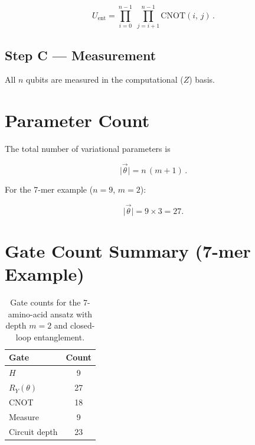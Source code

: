 \documentclass[11pt,a4paper]{article}
\begin{document}
\begin{equation}
  U_{\mathrm{ent}}
    = \prod_{i=0}^{n-1}\;\prod_{j=i+1}^{n-1}
      \mathrm{CNOT}(i,\,j)\,.
\end{equation}

\subsection{Step C --- Measurement}

All $n$ qubits are measured in the computational ($Z$) basis.

\section{Parameter Count}

The total number of variational parameters is

\begin{equation}
  \lvert\vec\theta\rvert = n\,(m+1)\,.
\end{equation}

For the 7-mer example ($n=9$, $m=2$):

\begin{equation}
  \lvert\vec\theta\rvert = 9 \times 3 = 27.
\end{equation}

\section{Gate Count Summary (7-mer Example)}

\begin{table}[h]
\centering
\begin{tabular}{@{}lc@{}}
  \toprule
  \textbf{Gate}        & \textbf{Count} \\
  \midrule
  $H$                  & 9  \\
  $R_Y(\theta)$        & 27 \\
  CNOT                 & 18 \\
  Measure              & 9  \\
  \midrule
  Circuit depth        & 23 \\
  \bottomrule
\end{tabular}
\caption{Gate counts for the 7-amino-acid ansatz with depth $m=2$
         and closed-loop entanglement.}
\end{table}
\end{document}
